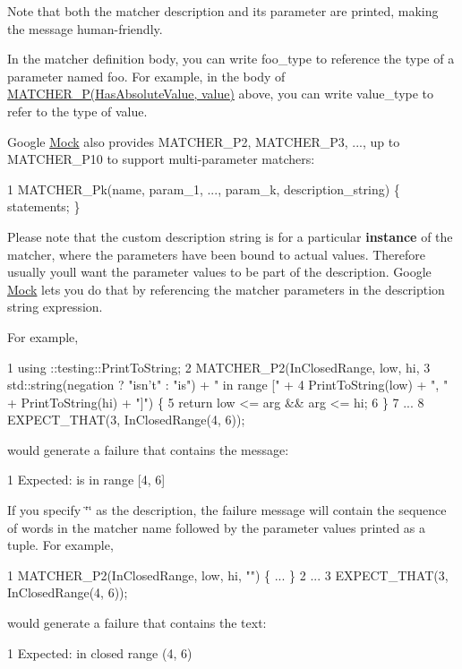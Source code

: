 Note that both the matcher description and its parameter are printed, making the message human-\/friendly.

In the matcher definition body, you can write {\ttfamily foo\+\_\+type} to reference the type of a parameter named {\ttfamily foo}. For example, in the body of {\ttfamily \hyperlink{gmock-generated-matchers_8h_acb7ae915efa2fd8d3f6ea7313198afb6}{M\+A\+T\+C\+H\+E\+R\+\_\+\+P(\+Has\+Absolute\+Value, value)}} above, you can write {\ttfamily value\+\_\+type} to refer to the type of {\ttfamily value}.

Google \hyperlink{class_mock}{Mock} also provides {\ttfamily M\+A\+T\+C\+H\+E\+R\+\_\+\+P2}, {\ttfamily M\+A\+T\+C\+H\+E\+R\+\_\+\+P3}, ..., up to {\ttfamily M\+A\+T\+C\+H\+E\+R\+\_\+\+P10} to support multi-\/parameter matchers\+: 
\begin{DoxyCode}
1 MATCHER\_Pk(name, param\_1, ..., param\_k, description\_string) \{ statements; \}
\end{DoxyCode}


Please note that the custom description string is for a particular {\bfseries instance} of the matcher, where the parameters have been bound to actual values. Therefore usually you\textquotesingle{}ll want the parameter values to be part of the description. Google \hyperlink{class_mock}{Mock} lets you do that by referencing the matcher parameters in the description string expression.

For example, 
\begin{DoxyCode}
1 using ::testing::PrintToString;
2 MATCHER\_P2(InClosedRange, low, hi,
3            std::string(negation ? "isn't" : "is") + " in range [" +
4            PrintToString(low) + ", " + PrintToString(hi) + "]") \{
5   return low <= arg && arg <= hi;
6 \}
7 ...
8 EXPECT\_THAT(3, InClosedRange(4, 6));
\end{DoxyCode}
 would generate a failure that contains the message\+: 
\begin{DoxyCode}
1 Expected: is in range [4, 6]
\end{DoxyCode}


If you specify {\ttfamily \char`\"{}\char`\"{}} as the description, the failure message will contain the sequence of words in the matcher name followed by the parameter values printed as a tuple. For example, 
\begin{DoxyCode}
1 MATCHER\_P2(InClosedRange, low, hi, "") \{ ... \}
2 ...
3 EXPECT\_THAT(3, InClosedRange(4, 6));
\end{DoxyCode}
 would generate a failure that contains the text\+: 
\begin{DoxyCode}
1 Expected: in closed range (4, 6)
\end{DoxyCode}


